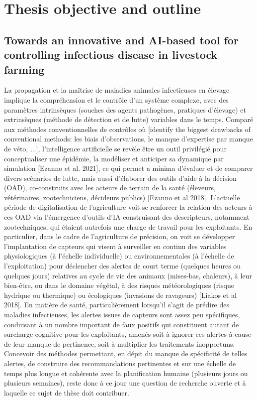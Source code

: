 \section{Thesis objective and outline}

\subsection{Towards an innovative and AI-based tool for controlling infectious disease in livestock farming}


La propagation et la maîtrise de maladies animales infectieuses en élevage implique la compréhension et le contrôle d’un système complexe, avec des paramètres intrinsèques (souches des agents pathogènes, pratiques d'élevage) et extrinsèques (méthode de détection et de lutte) variables dans le temps. 
Comparé aux méthodes conventionnelles de contrôles où [identify the biggest drawbacks of conventional methods: les biais d'observations, le manque d'expertise par manque de véto, ...], l’intelligence artificielle se revèle être un outil privilégié pour conceptualiser une épidémie, la modéliser et anticiper sa dynamique par simulation [Ezanno et al. 2021], ce qui permet a minima d’évaluer et de comparer divers scénarios de lutte, mais aussi d’élaborer des outils d’aide à la décision (OAD), co-construits avec les acteurs de terrain de la santé (éleveurs, vétérinaires, zootechniciens, décideurs publics) [Ezanno et al 2018]. L'actuelle période de digitalisation de l’agriculture voit se renforcer la relation des acteurs à ces OAD via l'émergence d'outils d’IA construisant des descripteurs, notamment zootechniques, qui étaient autrefois une charge de travail pour les exploitants. En particulier, dans le cadre de l’agriculture de précision, on voit se développer l’implantation de capteurs qui visent à surveiller en continu des variables physiologiques (à l’échelle individuelle) ou environnementales (à l’échelle de l’exploitation) pour déclencher des alertes de court terme (quelques heures ou quelques jours) relatives au cycle de vie des animaux (mises-bas, chaleurs), à leur bien-être, ou dans le domaine végétal, à des risques météorologiques (risque hydrique ou thermique) ou écologiques (invasions de ravageurs) [Liakos et al 2018]. En matière de santé, particulièrement lorsqu'il s'agit de prédire des maladies infectieuses, les alertes issues de capteurs sont assez peu spécifiques, conduisant à un nombre important de faux positifs qui constituent autant de surcharge cognitive pour les exploitants, amenés soit à ignorer ces alertes à cause de leur manque de pertinence, soit à multiplier les traitements inopportuns. Concevoir des méthodes permettant, en dépit du manque de spécificité de telles alertes, de construire des recommandations pertinentes et sur une échelle de temps plus longue et cohérente avec la planification humaine (plusieurs jours ou plusieurs semaines), reste donc à ce jour une question de recherche ouverte et à laquelle ce sujet de thèse doit contribuer.
